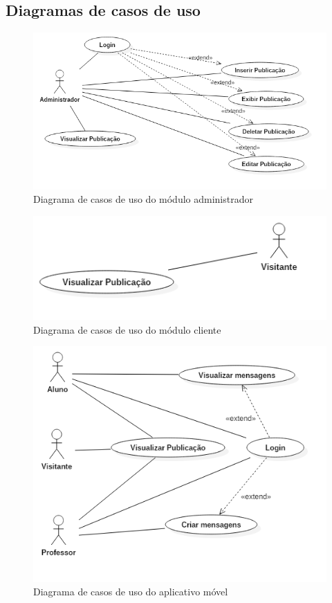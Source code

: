 \subsection{Diagramas de casos de uso}
\begin{figure}[H]
    \centering
    \includegraphics[width=\textwidth]{figuras/casosDeUsoADM}
    \caption{Diagrama de casos de uso do módulo administrador}
\end{figure}

\begin{figure}[H]
    \centering
    \includegraphics[width=\textwidth]{figuras/CasosDeUsoCliente}
    \caption{Diagrama de casos de uso do módulo cliente}
\end{figure}

\begin{figure}
    \centering
    \includegraphics[width=\textwidth]{figuras/CasosDeUsoMobile}
    \caption{Diagrama de casos de uso do aplicativo móvel}
\end{figure}

